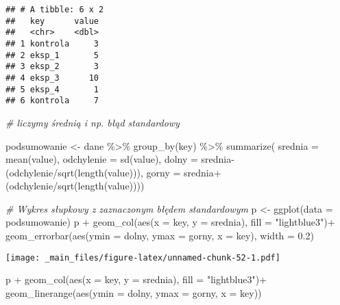\documentclass[
]{book}
\newenvironment{Shaded}{\begin{snugshade}}{\end{snugshade}}
\newcommand{\AttributeTok}[1]{\textcolor[rgb]{0.77,0.63,0.00}{#1}}
\newcommand{\CommentTok}[1]{\textcolor[rgb]{0.56,0.35,0.01}{\textit{#1}}}
\newcommand{\FloatTok}[1]{\textcolor[rgb]{0.00,0.00,0.81}{#1}}
\newcommand{\FunctionTok}[1]{\textcolor[rgb]{0.00,0.00,0.00}{#1}}
\newcommand{\NormalTok}[1]{#1}
\newcommand{\OtherTok}[1]{\textcolor[rgb]{0.56,0.35,0.01}{#1}}
\newcommand{\SpecialCharTok}[1]{\textcolor[rgb]{0.00,0.00,0.00}{#1}}
\newcommand{\StringTok}[1]{\textcolor[rgb]{0.31,0.60,0.02}{#1}}
\begin{document}
\begin{verbatim}
## # A tibble: 6 x 2
##   key      value
##   <chr>    <dbl>
## 1 kontrola     3
## 2 eksp_1       5
## 3 eksp_2       3
## 4 eksp_3      10
## 5 eksp_4       1
## 6 kontrola     7
\end{verbatim}

\begin{Shaded}
\begin{Highlighting}[]
\CommentTok{\# liczymy średnią i np. błąd standardowy}

\NormalTok{podsumowanie }\OtherTok{\textless{}{-}}\NormalTok{ dane }\SpecialCharTok{\%\textgreater{}\%} \FunctionTok{group\_by}\NormalTok{(key) }\SpecialCharTok{\%\textgreater{}\%}
  \FunctionTok{summarize}\NormalTok{(                      }\AttributeTok{srednia =} \FunctionTok{mean}\NormalTok{(value), }
                                  \AttributeTok{odchylenie =} \FunctionTok{sd}\NormalTok{(value), }
                                  \AttributeTok{dolny =}\NormalTok{ srednia}\SpecialCharTok{{-}}\NormalTok{(odchylenie}\SpecialCharTok{/}\FunctionTok{sqrt}\NormalTok{(}\FunctionTok{length}\NormalTok{(value))), }
                                  \AttributeTok{gorny =}\NormalTok{ srednia}\SpecialCharTok{+}\NormalTok{(odchylenie}\SpecialCharTok{/}\FunctionTok{sqrt}\NormalTok{(}\FunctionTok{length}\NormalTok{(value))))}

\CommentTok{\# Wykres słupkowy z zaznaczonym błędem standardowym}
\NormalTok{p }\OtherTok{\textless{}{-}} \FunctionTok{ggplot}\NormalTok{(}\AttributeTok{data =}\NormalTok{ podsumowanie)}
\NormalTok{p }\SpecialCharTok{+} \FunctionTok{geom\_col}\NormalTok{(}\FunctionTok{aes}\NormalTok{(}\AttributeTok{x =}\NormalTok{ key, }\AttributeTok{y =}\NormalTok{ srednia), }\AttributeTok{fill =} \StringTok{"lightblue3"}\NormalTok{)}\SpecialCharTok{+}
  \FunctionTok{geom\_errorbar}\NormalTok{(}\FunctionTok{aes}\NormalTok{(}\AttributeTok{ymin =}\NormalTok{ dolny, }\AttributeTok{ymax =}\NormalTok{ gorny, }\AttributeTok{x =}\NormalTok{ key), }\AttributeTok{width =} \FloatTok{0.2}\NormalTok{)}
\end{Highlighting}
\end{Shaded}

\texttt{[image: \_main\_files/figure-latex/unnamed-chunk-52-1.pdf]}

\begin{Shaded}
\begin{Highlighting}[]
\NormalTok{p }\SpecialCharTok{+} \FunctionTok{geom\_col}\NormalTok{(}\FunctionTok{aes}\NormalTok{(}\AttributeTok{x =}\NormalTok{ key, }\AttributeTok{y =}\NormalTok{ srednia), }\AttributeTok{fill =} \StringTok{"lightblue3"}\NormalTok{)}\SpecialCharTok{+}
  \FunctionTok{geom\_linerange}\NormalTok{(}\FunctionTok{aes}\NormalTok{(}\AttributeTok{ymin =}\NormalTok{ dolny, }\AttributeTok{ymax =}\NormalTok{ gorny, }\AttributeTok{x =}\NormalTok{ key))}
\end{Highlighting}
\end{Shaded}
\end{document}
